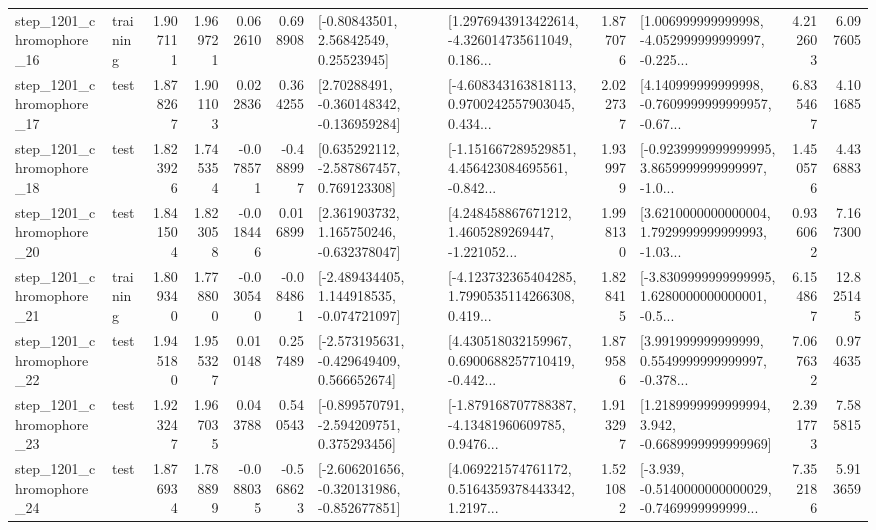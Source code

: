 \begin{tabular}{llrrrrllrlrr}
 step\_1201\_chromophore\_16 &  training &      1.907111 &    1.969721 &      0.062610 &  0.698908 &       [-0.80843501, 2.56842549, 0.25523945] &  [1.2976943913422614, -4.326014735611049, 0.186... &       1.877076 &  [1.006999999999998, -4.052999999999997, -0.225... &            4.212603 &          6.097605 \\
 step\_1201\_chromophore\_17 &      test &      1.878267 &    1.901103 &      0.022836 &  0.364255 &    [2.70288491, -0.360148342, -0.136959284] &  [-4.608343163818113, 0.9700242557903045, 0.434... &       2.022737 &  [4.140999999999998, -0.7609999999999957, -0.67... &            6.835467 &          4.101685 \\
 step\_1201\_chromophore\_18 &      test &      1.823926 &    1.745354 &     -0.078571 & -0.488997 &    [0.635292112, -2.587867457, 0.769123308] &  [-1.151667289529851, 4.456423084695561, -0.842... &       1.939979 &  [-0.9239999999999995, 3.8659999999999997, -1.0... &            1.450576 &          4.436883 \\
 step\_1201\_chromophore\_20 &      test &      1.841504 &    1.823058 &     -0.018446 &  0.016899 &    [2.361903732, 1.165750246, -0.632378047] &  [4.248458867671212, 1.4605289269447, -1.221052... &       1.998130 &  [3.6210000000000004, 1.7929999999999993, -1.03... &            0.936062 &          7.167300 \\
 step\_1201\_chromophore\_21 &  training &      1.809340 &    1.778800 &     -0.030540 & -0.084861 &   [-2.489434405, 1.144918535, -0.074721097] &  [-4.123732365404285, 1.7990535114266308, 0.419... &       1.828415 &  [-3.8309999999999995, 1.6280000000000001, -0.5... &            6.154867 &         12.825145 \\
 step\_1201\_chromophore\_22 &      test &      1.945180 &    1.955327 &      0.010148 &  0.257489 &   [-2.573195631, -0.429649409, 0.566652674] &  [4.430518032159967, 0.6900688257710419, -0.442... &       1.879586 &  [3.991999999999999, 0.5549999999999997, -0.378... &            7.067632 &          0.974635 \\
 step\_1201\_chromophore\_23 &      test &      1.923247 &    1.967035 &      0.043788 &  0.540543 &   [-0.899570791, -2.594209751, 0.375293456] &  [-1.879168707788387, -4.13481960609785, 0.9476... &       1.913297 &   [1.2189999999999994, 3.942, -0.6689999999999969] &            2.391773 &          7.585815 \\
 step\_1201\_chromophore\_24 &      test &      1.876934 &    1.788899 &     -0.088035 & -0.568623 &  [-2.606201656, -0.320131986, -0.852677851] &  [4.069221574761172, 0.5164359378443342, 1.2197... &       1.521082 &  [-3.939, -0.5140000000000029, -0.7469999999999... &            7.352186 &          5.913659 \\

\end{tabular}
